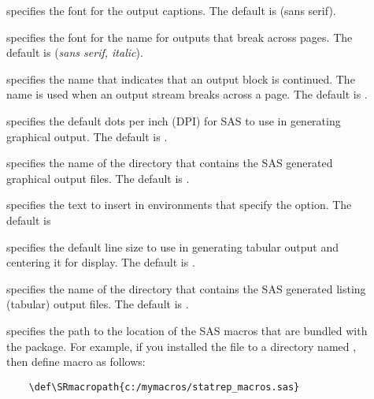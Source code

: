 \documentclass[article,oneside]{memoir}
\begin{document}
    \begin{description}
     \item[] specifies the font for the output captions. 
     The default is  (\textsf{sans serif}).
     
     \item[] specifies the font for the  name
     for outputs that break across pages.
     The default is  (\textsf{\textit{sans serif, italic}}).

     \item[] specifies the name that indicates that an output
     block is continued. The name is used when an output stream breaks across a page.
     The default is .
     
    \item[] specifies the default dots per inch (DPI) for SAS to use in generating
    graphical output. The default is .

    \item[] specifies the name of the directory that contains the SAS
     generated graphical output files. The default is .
     
    \item[] specifies the text to insert in
     environments that specify
     the  option. The default is 
     
    \item[] specifies the default line size to use in generating tabular
    output and centering it for display. The default is . 
    
     \item[] specifies the name of the directory that contains the SAS
     generated listing (tabular) output files. The default is .

     \item[] specifies the path to the location of the 
     SAS macros that are bundled with the  package. 
     For example, if  you installed the  file to a directory named 
    ,
    then define macro  as follows:
    \begin{verbatim}
    \def\SRmacropath{c:/mymacros/statrep_macros.sas}
    \end{verbatim}


\end{description}
\end{document}
